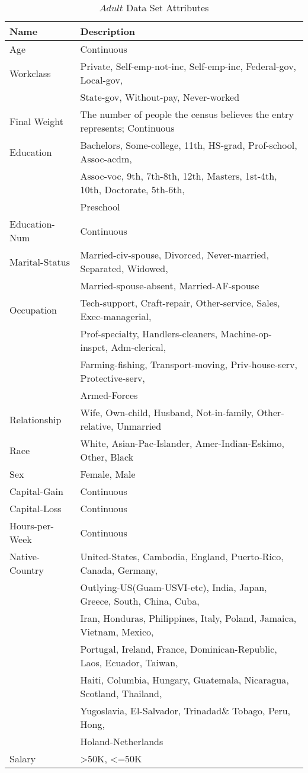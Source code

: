 \documentclass{article}
\begin{document}
\begin{table}
  \caption{$Adult$ Data Set Attributes \citep{Adult}}
  \label{attributes}
  \centering
  \begin{tabular}{ll}
    \toprule
    Name     & Description\\
    \midrule
    Age & Continuous\\
    Workclass & Private, Self-emp-not-inc, Self-emp-inc, Federal-gov, Local-gov,\\ &State-gov, Without-pay, Never-worked\\
    Final Weight & The number of people the census believes the entry represents; Continuous\\
    Education & Bachelors, Some-college, 11th, HS-grad, Prof-school, Assoc-acdm, \\&Assoc-voc, 9th, 7th-8th, 12th, Masters, 1st-4th, 10th, Doctorate, 5th-6th, \\&Preschool\\
    Education-Num & Continuous\\
    Marital-Status & Married-civ-spouse, Divorced, Never-married, Separated, Widowed, \\&Married-spouse-absent, Married-AF-spouse\\
    Occupation & Tech-support, Craft-repair, Other-service, Sales, Exec-managerial, \\&Prof-specialty, Handlers-cleaners, Machine-op-inspct, Adm-clerical, \\&Farming-fishing, Transport-moving, Priv-house-serv, Protective-serv, \\&Armed-Forces\\
    Relationship & Wife, Own-child, Husband, Not-in-family, Other-relative, Unmarried\\
    Race & White, Asian-Pac-Islander, Amer-Indian-Eskimo, Other, Black\\
    Sex & Female, Male\\
    Capital-Gain & Continuous\\
    Capital-Loss & Continuous\\
    Hours-per-Week & Continuous\\
    Native-Country & United-States, Cambodia, England, Puerto-Rico, Canada, Germany, \\&Outlying-US(Guam-USVI-etc), India, Japan, Greece, South, China, Cuba, \\&Iran, Honduras, Philippines, Italy, Poland, Jamaica, Vietnam, Mexico, \\&Portugal, Ireland, France, Dominican-Republic, Laos, Ecuador, Taiwan, \\&Haiti, Columbia, Hungary, Guatemala, Nicaragua, Scotland, Thailand, \\&Yugoslavia, El-Salvador, Trinadad\& Tobago, Peru, Hong, \\&Holand-Netherlands\\
    Salary & >50K, <=50K\\
    \bottomrule
  \end{tabular}
\end{table}
\end{document}
